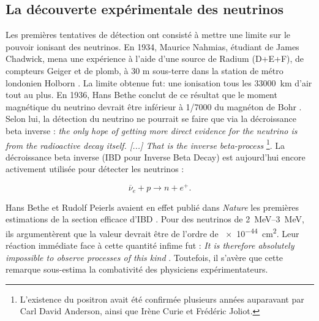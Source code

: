 
\bigbreak

\subsection{La découverte expérimentale des neutrinos}
\label{seq:neutrino_experimental_discovery}

Les premières tentatives de détection ont consisté à mettre une limite sur le pouvoir ionisant des neutrinos. En 1934, Maurice Nahmias, étudiant de James Chadwick, mena une expérience à l'aide d'une source de Radium (D+E+F), de compteurs Geiger et de plomb, à 30 m sous-terre dans la station de métro londonien Holborn \cite{Bouchez:1993hr}. La limite obtenue fut: une ionisation tous les \SI{33000}{km} d'air tout au plus. En 1936, Hans Bethe conclut de ce résultat que le moment magnétique du neutrino devrait être inférieur à \num{1/7000} du magnéton de Bohr \cite{Bethe:1936zz}. Selon lui, la détection du neutrino ne pourrait se faire que via la décroissance beta inverse : \og \textit{the only hope of getting more direct evidence for the neutrino is from the radioactive decay itself. [...] That is the inverse beta-process} \fg{}\footnote{L'existence du positron avait été confirmée plusieurs années auparavant par Carl David Anderson, ainsi que Irène Curie et Frédéric Joliot.}. La décroissance beta inverse (IBD pour Inverse Beta Decay) est aujourd'hui encore activement utilisée pour détecter les neutrinos :

\label{eq:IBD}
\begin{equation}
    \overline{\nu}_e + p \rightarrow n + e^+.
\end{equation}

\bigbreak

Hans Bethe et Rudolf Peierls avaient en effet publié dans \textit{Nature} les premières estimations de la section efficace d'IBD \cite{Bethe:1934qn}. Pour des neutrinos de \SIrange{2}{3}{MeV}, ils argumentèrent que la valeur devrait être de l'ordre de \SI{e-44}{cm^2}. Leur réaction immédiate face à cette quantité infime fut : \og \textit{It is therefore absolutely impossible to observe processes of this kind} \fg{}. Toutefois, il s'avère que cette remarque sous-estima la combativité des physiciens expérimentateurs.\\

